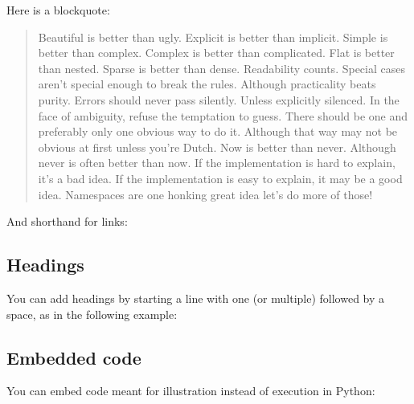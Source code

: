 \documentclass[letterpaper,10pt,english]{sphinxmanual}
\begin{document}
Here is a blockquote:
\begin{quote}

Beautiful is better than ugly. Explicit is better than implicit. Simple is better than complex. Complex is better than complicated. Flat is better than nested. Sparse is better than dense. Readability counts. Special cases aren’t special enough to break the rules. Although practicality beats purity. Errors should never pass silently. Unless explicitly silenced. In the face of ambiguity, refuse the temptation to guess. There should be one\textendash{} and preferably only one \textendash{}obvious way to do it.
Although that way may not be obvious at first unless you’re Dutch. Now is better than never. Although never is often better than  now. If the implementation is hard to explain, it’s a bad idea. If the implementation is easy to explain, it may be a good idea. Namespaces are one honking great idea \textendash{} let’s do more of those!
\end{quote}

And shorthand for links:



\subsection{Headings}
\label{\detokenize{notebooks/Intro/EditCells:Headings}}
You can add headings by starting a line with one (or multiple) \sphinxcode{\sphinxupquote{\#}} followed by a space, as in the following example:

\begin{sphinxVerbatim}[commandchars=\\\{\}]
\end{sphinxVerbatim}


\subsection{Embedded code}
\label{\detokenize{notebooks/Intro/EditCells:Embedded-code}}
You can embed code meant for illustration instead of execution in Python:

\begin{sphinxVerbatim}[commandchars=\\\{\}]
 
     
\end{sphinxVerbatim}
\end{document}
